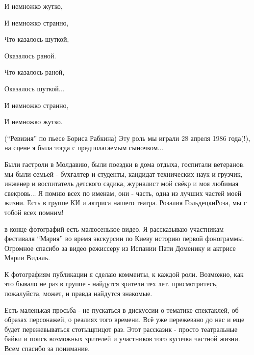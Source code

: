 И немножко жутко, 

И немножко странно, 

Что казалось шуткой, 

Оказалось раной. 

Что казалось раной, 

Оказалось шуткой... 

И немножко странно, 

И немножко жутко. 

(\enquote{Ревизия} по пьесе Бориса Рабкина) Эту роль мы играли 28 апреля 1986 года(!),
на сцене я была тогда с предполагаемым сыночком...

Были гастроли в Молдавию, были поездки в дома отдыха, госпитали ветеранов. мы
были семьей - бухгалтер и студенты, кандидат технических наук и грузчик,
инженер и воспитатель детского садика, журналист мой свёкр и моя любимая
свекровь... Я помню всех по именам, они - часть, одна из лучших частей моей
жизни. Есть в группе КИ  и актриса нашего театра.  Розалия ГольдецкиРоза, мы с
тобой всех помним! 

в конце фотографий есть малюсенькое видео. Я рассказываю участникам фестиваля
\enquote{Мария} во время экскурсии по Киеву историю первой фонограммы. Огромное спасибо
за видео режиссеру из Испании Пати Доменику  и актрисе Марии Видаль. 

К фотографиям публикации я сделаю комменты, к каждой роли. Возможно, как это
бывало не раз в группе - найдутся зрители тех лет. присмотритесь, пожалуйста,
может, и правда найдутся знакомые.

Есть маленькая просьба - не пускаться в дискуссии о тематике спектаклей, об
образах персонажей, о реалиях того времени. Всё уже пережевано до нас и еще
будет пережевываться стотыщпицот раз. Этот рассказик - просто театральные байки
и поиск возможных зрителей и участников того кусочка частной жизни. Всем
спасибо за понимание.
